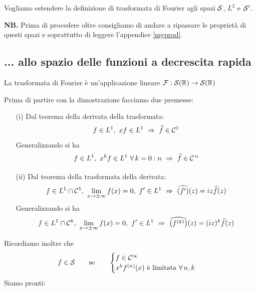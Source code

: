 Vogliamo estendere la definizione di trasformata di Fourier agli spazi $\mathcal{S}$, $L^2$ e $\mathcal{S}'$.

\textbf{NB.} Prima di procedere oltre consigliamo di andare a ripassare le proprietà di questi spazi e soprattutto di leggere l'appendice
\ref{myprod}.


\subsection{... allo spazio delle funzioni a decrescita rapida}

\begin{thm}
La trasformata di Fourier è un'applicazione lineare $\mathcal{F} : \mathcal{S}(\mathbb{R})\rightarrow \mathcal{S}(\mathbb{R})$
\end{thm}

Prima di partire con la dimostrazione facciamo due premesse:
\begin{enumerate}
    \item[(i)] Dal teorema della derivata della trasformata:
    \begin{equation*}
    f\in L^1,\ xf\in L^1\ \Rightarrow\ \hat{f}\in\Cc^1
    \end{equation*}
    Generalizzando si ha
    \begin{equation*}
    f\in L^1,\ x^kf\in L^1\ \forall k=0:n\ \Rightarrow\ \hat{f}\in\Cc^{\,n}
    \end{equation*}

    \item[(ii)] Dal teorema della trasformata della derivata:
    \begin{equation*}
    f\in L^1\cap \Cc^1,\ \lim_{x\to\pm\infty} f(x)=0,\ f'\in L^1\ \Rightarrow\ \hat{(f')}(z)=iz\hat{f}(z)
    \end{equation*}
    Generalizzando si ha
    \begin{equation*}
    f\in L^1\cap \Cc^k,\ \lim_{x\to\pm\infty} f(x)=0,\ f'\in L^1\ \Rightarrow\ \hat{\left(f^{(k)}\right)}(z)=(iz)^k\hat{f}(z)
    \end{equation*}
\end{enumerate}

Ricordiamo inoltre che
\begin{equation*}
f\in\Sc\qquad\text{se}\qquad \begin{cases}
f\in\Cc^\infty \\
x^kf^{(n)}(x)\text{ è limitata }\forall n,k
\end{cases}
\end{equation*}
Siamo pronti:

